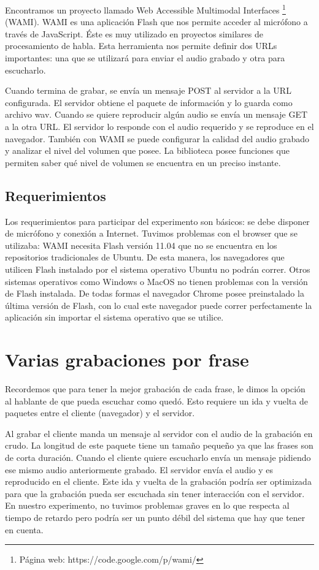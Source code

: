 Encontramos un proyecto llamado Web Accessible Multimodal Interfaces \footnote{Página web: https://code.google.com/p/wami/} (WAMI). WAMI es una aplicación Flash que nos permite acceder al micrófono a través de JavaScript. Éste es muy utilizado en proyectos similares de procesamiento de habla. Esta herramienta nos permite definir dos URLs importantes: una que se utilizará para enviar el audio grabado y otra para escucharlo.  

Cuando termina de grabar, se envía un mensaje POST al servidor a la URL configurada. El servidor obtiene el paquete de información y lo guarda como archivo wav. Cuando se quiere reproducir algún audio se envía un mensaje GET a la otra URL. El servidor lo responde con el audio requerido y se reproduce en el navegador. También con WAMI se puede configurar la calidad del audio grabado y analizar el nivel del volumen que posee. La biblioteca posee funciones que permiten saber qué nivel de volumen se encuentra en un preciso instante.

\subsection{Requerimientos}

Los requerimientos para participar del experimento son básicos: se debe disponer de micrófono y conexión a Internet. Tuvimos problemas con el browser que se utilizaba: WAMI necesita Flash versión 11.04 que no se encuentra en los repositorios tradicionales de Ubuntu. De esta manera, los navegadores que utilicen Flash instalado por el sistema operativo Ubuntu no podrán correr. Otros sistemas operativos como Windows o MacOS no tienen problemas con la versión de Flash instalada. De todas formas el navegador Chrome posee preinstalado la última versión de Flash, con lo cual este navegador puede correr perfectamente la aplicación sin importar el sistema operativo que se utilice.

\section{Varias grabaciones por frase}

Recordemos que para tener la mejor grabación de cada frase, le dimos la opción al hablante de que pueda escuchar como quedó. Esto requiere un ida y vuelta de paquetes entre el cliente (navegador) y el servidor. 

Al grabar el cliente manda un mensaje al servidor con el audio de la grabación en crudo. La longitud de este paquete tiene un tamaño pequeño ya que las frases son de corta duración. Cuando el cliente quiere escucharlo envía un mensaje pidiendo ese mismo audio anteriormente grabado. El servidor envía el audio y es reproducido en el cliente. Este ida y vuelta de la grabación podría ser optimizada para que la grabación pueda ser escuchada sin tener interacción con el servidor. En nuestro experimento, no tuvimos problemas graves en lo que respecta al tiempo de retardo pero podría ser un punto débil del sistema que hay que tener en cuenta.

